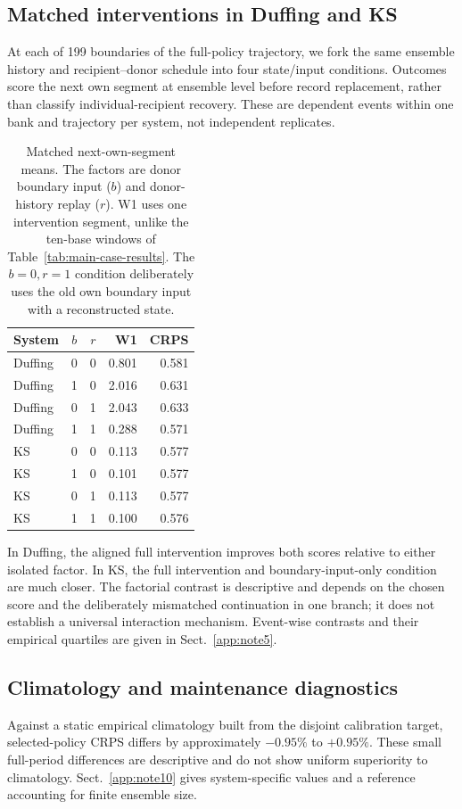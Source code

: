 \documentclass[gmd,manuscript]{copernicus}
\begin{document}
\subsection{Matched interventions in Duffing and KS}
At each of 199 boundaries of the full-policy trajectory, we fork the same ensemble history and recipient--donor schedule into four state/input conditions. Outcomes score the next own segment at ensemble level before record replacement, rather than classify individual-recipient recovery. These are dependent events within one bank and trajectory per system, not independent replicates.
\begin{table}[!htbp]\caption{Matched next-own-segment means. The factors are donor boundary input ($b$) and donor-history replay ($r$). W1 uses one intervention segment, unlike the ten-base windows of Table~\ref{tab:main-case-results}. The $b=0,r=1$ condition deliberately uses the old own boundary input with a reconstructed state.}\label{tab:matched-controls}
\centering\small\begin{tabular}{lccrr}\toprule System & $b$ & $r$ & W1 & CRPS\\\midrule
Duffing & 0 & 0 & 0.801 & 0.581\\
Duffing & 1 & 0 & 2.016 & 0.631\\
Duffing & 0 & 1 & 2.043 & 0.633\\
Duffing & 1 & 1 & 0.288 & 0.571\\
KS & 0 & 0 & 0.113 & 0.577\\
KS & 1 & 0 & 0.101 & 0.577\\
KS & 0 & 1 & 0.113 & 0.577\\
KS & 1 & 1 & 0.100 & 0.576\\
\bottomrule\end{tabular}\end{table}
In Duffing, the aligned full intervention improves both scores relative to either isolated factor. In KS, the full intervention and boundary-input-only condition are much closer. The factorial contrast is descriptive and depends on the chosen score and the deliberately mismatched continuation in one branch; it does not establish a universal interaction mechanism. Event-wise contrasts and their empirical quartiles are given in Sect.~\ref{app:note5}.


\subsection{Climatology and maintenance diagnostics}
Against a static empirical climatology built from the disjoint calibration target, selected-policy CRPS differs by approximately $-0.95\%$ to $+0.95\%$. These small full-period differences are descriptive and do not show uniform superiority to climatology. Sect.~\ref{app:note10} gives system-specific values and a reference accounting for finite ensemble size.
\end{document}
